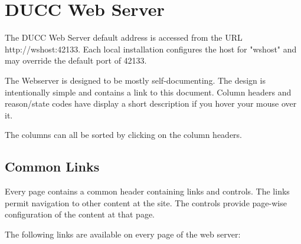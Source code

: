 \chapter{DUCC Web Server}

    The DUCC Web Server default address is accessed from the URL http://wshost:42133. Each local
    installation configures the host for "wshost" and may override the default port of 42133.

    The Webserver is designed to be mostly self-documenting. The design is intentionally simple 
    and contains a link to this document. Column headers and reason/state codes have display a short 
    description if you hover your mouse over it. 

    The columns can all be sorted by clicking on the column headers. 

    \section{Common Links}

        Every page contains a common header containing links and controls. The links permit navigation
        to other content at the site. The controls provide page-wise configuration of the content at
        that page.

        The following links are available on every page of the web server: 

